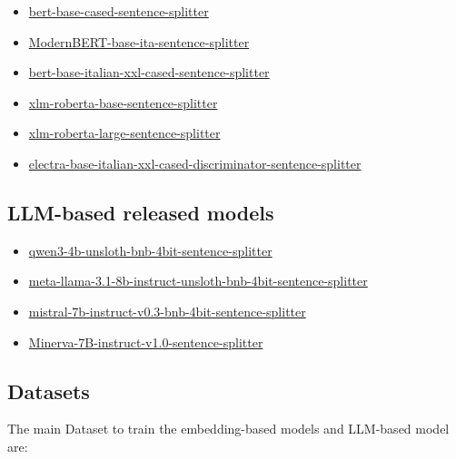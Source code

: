 \documentclass[11pt]{article}
\begin{document}
 \begin{itemize}
 \item \href{https://huggingface.co/fax4ever/bert-base-cased-sentence-splitter}{bert-base-cased-sentence-splitter}
 \item \href{https://huggingface.co/fax4ever/ModernBERT-base-ita-sentence-splitter}{ModernBERT-base-ita-sentence-splitter}
 \item \href{https://huggingface.co/fax4ever/bert-base-italian-xxl-cased-sentence-splitter}{bert-base-italian-xxl-cased-sentence-splitter}
 \item \href{https://huggingface.co/fax4ever/xlm-roberta-base-sentence-splitter}{xlm-roberta-base-sentence-splitter}
 \item \href{https://huggingface.co/fax4ever/xlm-roberta-large-sentence-splitter}{xlm-roberta-large-sentence-splitter}
 \item \href{https://huggingface.co/fax4ever/electra-base-italian-xxl-cased-discriminator-sentence-splitter}{electra-base-italian-xxl-cased-discriminator-sentence-splitter}
\end{itemize}

\subsection{LLM-based released models}

\begin{itemize}
	\item 
	\href{https://huggingface.co/fax4ever/qwen3-4b-unsloth-bnb-4bit-sentence-splitter}{qwen3-4b-unsloth-bnb-4bit-sentence-splitter}
	\item 
	\href{https://huggingface.co/fax4ever/meta-llama-3.1-8b-instruct-unsloth-bnb-4bit-sentence-splitter}{meta-llama-3.1-8b-instruct-unsloth-bnb-4bit-sentence-splitter}
	\item \href{https://huggingface.co/fax4ever/mistral-7b-instruct-v0.3-bnb-4bit-sentence-splitter}{mistral-7b-instruct-v0.3-bnb-4bit-sentence-splitter}
	\item \href{https://huggingface.co/fax4ever/Minerva-7B-instruct-v1.0-sentence-splitter}{Minerva-7B-instruct-v1.0-sentence-splitter}
\end{itemize}

\subsection{Datasets}

The main Dataset to train the embedding-based models and LLM-based model are:
\end{document}
